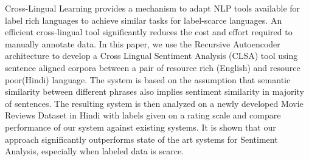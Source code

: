 Cross-Lingual Learning provides a mechanism to adapt NLP tools available for label rich languages to achieve similar tasks for label-scarce languages. An efficient cross-lingual tool significantly reduces the cost and effort required to manually annotate data. In this paper, we use the Recursive Autoencoder architecture to develop a Cross Lingual Sentiment Analysis (CLSA) tool using sentence aligned corpora between a pair of resource rich (English) and resource poor(Hindi) language. The system is based on the assumption that semantic similarity between different phrases also implies sentiment similarity in majority of sentences. The resulting system is then analyzed on a newly developed Movie Reviews Dataset in Hindi with labels given on a rating scale and compare performance of our system against existing systems. It is shown that our approach significantly outperforms state of the art systems for Sentiment Analysis, especially when labeled data is scarce.
